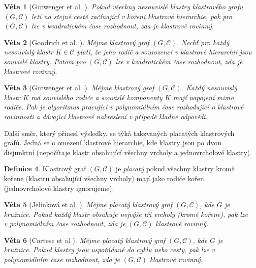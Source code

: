 \documentclass[12pt,a4report]{report}
\newtheorem{theorem}{Věta}[chapter]
\theoremstyle{definition}
\newtheorem{defn}[theorem]{Definice}
\begin{document}
\begin{theorem}[Gutwenger et al. \cite{GutwengerEtAl02}]
Pokud všechny nesouvislé klastry klastrového grafu $(G, \mathcal C)$ leží na stejné cestě začínající v kořeni klastrové hierarchie, pak pro $(G, \mathcal C)$ lze v kvadratickém čase rozhodnout, zda je klastrově rovinný.
\end{theorem}

\begin{theorem}[Goodrich et al. \cite{GoodrichEtAl05}]
Mějme klastrový graf $(G, \mathcal C)$. Nechť pro každý nesouvislý klastr $K \in \mathcal C$ platí, že jeho rodič a sourozenci v klastrové hierarchii jsou souvislé klastry. Potom pro $(G, \mathcal C)$ lze v kvadratickém čase rozhodnout, zda je klastrově rovinný.
\end{theorem}

\begin{theorem}[Gutwenger et al. \cite{GutwengerEtAl02}]
Mějme klastrový graf $(G, \mathcal C)$. Každý nesouvislý klastr $K$ má souvislého rodiče a souvislé komponenty $K$ mají napojení mimo rodiče. Pak je algoritmus pracující v polynomiálním čase rozhodující o klastrové rovinnosti a dávající klastrové nakreslení v případě kladné odpovědi.
\end{theorem}

Další směr, který přinesl výsledky, se týká takzvaných placatých klastrových grafů. Jedná se o omezení klastrové hierarchie, kde klastry jsou po dvou disjunktní (nepočítaje klastr obsahující všechny vrcholy a jednovrcholové klastry).

\begin{defn}
Klastrový graf $(G, \mathcal C)$ je \textit{placatý} pokud všechny klastry kromě kořene (klastru obsahující všechny vrcholy) mají jako rodiče kořen (jednovrcholové klastry ignorujeme).
\end{defn}

\begin{theorem}[Jelínková et al. \cite{JelinkovaEtAl07}]
Mějme placatý klastrový graf  $(G, \mathcal C)$, kde $G$ je kružnice. Pokud každý klastr obsahuje nejvýše tři vrcholy (kromě kořene), pak lze v polynomiálním čase rozhodnout, zda je  $(G, \mathcal C)$ klastrově rovinný.
\end{theorem}

\begin{theorem}[Cortese et al \cite{CorteseEtAl04}]
Mějme placatý klastrový graf  $(G, \mathcal C)$, kde $G$ je kružnice. Pokud klastry jsou uspořádané do cyklu nebo cesty, pak lze v polynomiálním čase rozhodnout, zda je  $(G, \mathcal C)$ klastrově rovinný.
\end{theorem}
\end{document}
